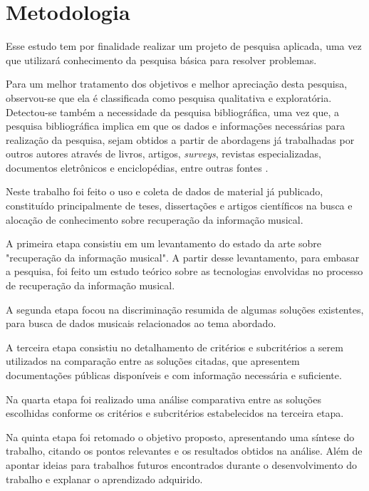 \section{Metodologia} \label{sec:metodologia}

Esse estudo tem por finalidade realizar um projeto de pesquisa aplicada, uma vez que utilizará conhecimento da pesquisa básica para resolver problemas.

Para um melhor tratamento dos objetivos e melhor apreciação desta pesquisa, observou-se que ela é classificada como pesquisa qualitativa e exploratória. Detectou-se também a necessidade da pesquisa bibliográfica, uma vez que, a pesquisa bibliográfica implica em que os dados e informações necessárias para realização da pesquisa, sejam obtidos a partir de abordagens já trabalhadas por outros autores através de livros, artigos, \textit{surveys}, revistas especializadas, documentos eletrônicos e enciclopédias, entre outras fontes \cite{ednalucia2005}.

Neste trabalho foi feito o uso e coleta de dados de material já publicado, constituído principalmente de teses, dissertações e artigos científicos na busca e alocação de conhecimento sobre recuperação da informação musical.

A primeira etapa consistiu em um levantamento do estado da arte sobre "recuperação da informação musical". A partir desse levantamento, para embasar a pesquisa, foi feito um estudo teórico sobre as tecnologias envolvidas no processo de recuperação da informação musical.

A segunda etapa focou na discriminação resumida de algumas soluções existentes, para busca de dados musicais relacionados ao tema abordado.

A terceira etapa consistiu no detalhamento de critérios e subcritérios a serem utilizados na comparação entre as soluções citadas, que apresentem documentações públicas disponíveis e com informação necessária e suficiente.

Na quarta etapa foi realizado uma análise comparativa entre as soluções escolhidas conforme os critérios e subcritérios estabelecidos na terceira etapa.

Na quinta etapa foi retomado o objetivo proposto, apresentando uma síntese do trabalho, citando os pontos relevantes e os resultados obtidos na análise. Além de apontar ideias para trabalhos futuros encontrados durante o desenvolvimento do trabalho e explanar o aprendizado adquirido.

